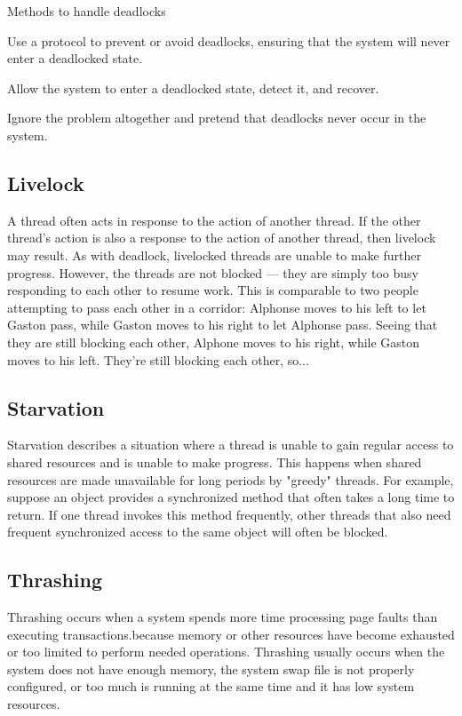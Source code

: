 Methods to handle deadlocks

\begindot
\item[Deadlock Prevention]Use a protocol to prevent or avoid deadlocks, ensuring that the
system will never enter a deadlocked state.
\item[Deadlock Avoidance] Allow the system to enter a deadlocked state, detect it, and recover.
\item[Deadlock Detection] Ignore the problem altogether and pretend that deadlocks never
occur in the system.
\myenddot

\subsection{Livelock}
A thread often acts in response to the action of another thread. If the other thread's action is also a response to the action of another thread, then livelock may result. As with 
deadlock, livelocked threads are unable to make further progress. However, the threads are not blocked — they are simply too busy responding to each other to resume work. This is 
comparable to two people attempting to pass each other in a corridor: Alphonse moves to his left to let Gaston pass, while Gaston moves to his right to let Alphonse pass. Seeing 
that they are still blocking each other, Alphone moves to his right, while Gaston moves to his left. They're still blocking each other, so...
\subsection{Starvation}
Starvation describes a situation where a thread is unable to gain regular access to shared resources and is unable to make progress. This happens when shared resources are made 
unavailable for long periods by "greedy" threads. For example, suppose an object provides a synchronized method that often takes a long time to return. If one thread invokes this 
method frequently, other threads that also need frequent synchronized access to the same object will often be blocked.
\subsection{Thrashing}
Thrashing occurs when a system spends more time processing page faults than executing transactions.because memory or other resources have become exhausted or too limited to 
perform needed operations. Thrashing usually occurs when the system does not have enough memory, the system swap file is not properly configured, or too much is running at the 
same time and it has low system resources.